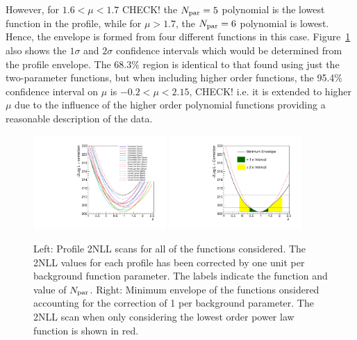 However, for $1.6 < \mu < 1.7$ 
CHECK!
the $N_{\rm par}=5$ polynomial is the lowest function in the profile,
while for $\mu > 1.7$,
the $N_{\rm par}=6$ polynomial is lowest.
Hence, the envelope is formed from four different functions in this
case. Figure~\ref{fig:correction:profiles} also shows the $1\sigma$ and 
$2\sigma$ confidence intervals which would be determined from the 
profile envelope. The 68.3\% region is identical to that found using
just the two-parameter functions, but
when including higher order functions, the 95.4\% confidence interval 
on $\mu$ is $-0.2 < \mu < 2.15$,
CHECK!
i.e. it is extended to higher $\mu$
due to the influence of the higher order polynomial functions providing a 
reasonable description of the data.

\begin{figure}[tbp]
\centering
\includegraphics[width=0.45\textwidth]{correction/ProfilesAllOrders.pdf}
\includegraphics[width=0.45\textwidth]{correction/EnvelopeAllOrders.pdf}
\caption{Left: Profile 2NLL scans for all of the functions considered. The 2NLL values for
each profile has been corrected by one unit per background function parameter.
The labels indicate the function and value of $N_{\rm par}$.
Right: Minimum envelope of the functions onsidered accounting for the correction of 1 per 
background parameter. The 2NLL scan when only considering the lowest order power law function 
is shown in red.}
\label{fig:correction:profiles}
\end{figure}


